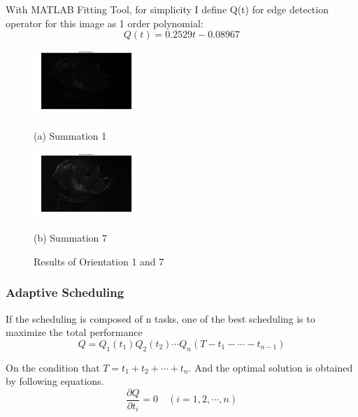 \documentclass[twocolumn]{article}
\begin{document}
With MATLAB Fitting Tool, for simplicity I define Q(t) for edge detection operator for this image as 1 order polynomial:
\begin{equation*}
Q(t) = 0.2529t-0.08967
\end{equation*}

\begin{figure}[H]
\begin{minipage}{0.48\linewidth}
  \centerline{\includegraphics[width=4.0cm]{Ori1.jpg}}
  \centerline{(a) Summation 1}
\end{minipage}
\hfill
\begin{minipage}{0.48\linewidth}
  \centerline{\includegraphics[width=4.0cm]{Ori6.jpg}}
  \centerline{(b) Summation 7}
\end{minipage}
 \caption{Results of Orientation 1 and 7}
\end{figure}

\subsubsection{Adaptive Scheduling}
If the scheduling is composed of n tasks, one of the best scheduling is to maximize the total performance
\begin{equation*}
Q = Q_1(t_1)Q_2(t_2)\cdots Q_n(T-t_1-\cdots-t_{n-1})
\end{equation*}

On the condition that $T = t_1+t_2+\cdots+t_n$. And the optimal solution is obtained by following equations.
\begin{equation*}
\frac{\partial Q}{\partial t_i} = 0 \quad(i=1,2,\cdots,n)
\end{equation*}
\end{document}
